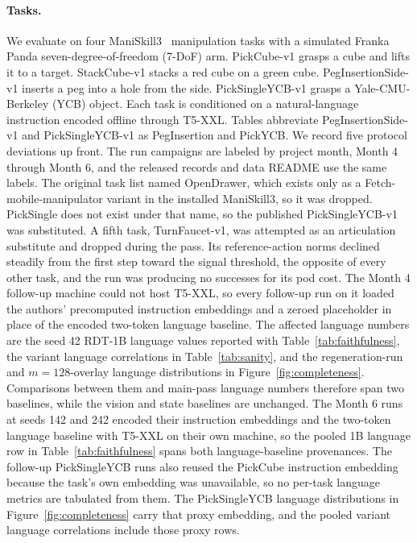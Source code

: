 \documentclass{article}
\begin{document}
\paragraph{Tasks.}
We evaluate on four ManiSkill3~\cite{tao2024maniskill3} manipulation tasks with a simulated Franka Panda seven-degree-of-freedom (7-DoF) arm.
PickCube-v1 grasps a cube and lifts it to a target.
StackCube-v1 stacks a red cube on a green cube.
PegInsertionSide-v1 inserts a peg into a hole from the side.
PickSingleYCB-v1 grasps a Yale-CMU-Berkeley (YCB) object.
Each task is conditioned on a natural-language instruction encoded offline through T5-XXL.
Tables abbreviate PegInsertionSide-v1 and PickSingleYCB-v1 as PegInsertion and PickYCB.
We record five protocol deviations up front.
The run campaigns are labeled by project month, Month 4 through Month 6, and the released records and data README use the same labels.
The original task list named OpenDrawer, which exists only as a Fetch-mobile-manipulator variant in the installed ManiSkill3, so it was dropped.
PickSingle does not exist under that name, so the published PickSingleYCB-v1 was substituted.
A fifth task, TurnFaucet-v1, was attempted as an articulation substitute and dropped during the pass.
Its reference-action norms declined steadily from the first step toward the signal threshold, the opposite of every other task, and the run was producing no successes for its pod cost.
The Month 4 follow-up machine could not host T5-XXL, so every follow-up run on it loaded the authors' precomputed instruction embeddings and a zeroed placeholder in place of the encoded two-token language baseline.
The affected language numbers are the seed 42 RDT-1B language values reported with Table~\ref{tab:faithfulness}, the variant language correlations in Table~\ref{tab:sanity}, and the regeneration-run and $m{=}128$-overlay language distributions in Figure~\ref{fig:completeness}.
Comparisons between them and main-pass language numbers therefore span two baselines, while the vision and state baselines are unchanged.
The Month 6 runs at seeds 142 and 242 encoded their instruction embeddings and the two-token language baseline with T5-XXL on their own machine, so the pooled 1B language row in Table~\ref{tab:faithfulness} spans both language-baseline provenances.
The follow-up PickSingleYCB runs also reused the PickCube instruction embedding because the task's own embedding was unavailable, so no per-task language metrics are tabulated from them.
The PickSingleYCB language distributions in Figure~\ref{fig:completeness} carry that proxy embedding, and the pooled variant language correlations include those proxy rows.
\end{document}
